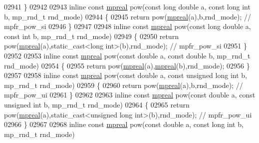 \begin{DoxyCode}
{{02941 \}
02942 
02943 \textcolor{keyword}{inline} \textcolor{keyword}{const} \hyperlink{classmpfr_1_1mpreal}{mpreal} pow(\textcolor{keyword}{const} \textcolor{keywordtype}{long} \textcolor{keywordtype}{double} a, \textcolor{keyword}{const} \textcolor{keywordtype}{long} \textcolor{keywordtype}{int} b, mp\_rnd\_t rnd\_mode)
02944 \{
02945     \textcolor{keywordflow}{return} pow(\hyperlink{classmpfr_1_1mpreal}{mpreal}(a),b,rnd\_mode); \textcolor{comment}{// mpfr\_pow\_si}
02946 \}
02947 
02948 \textcolor{keyword}{inline} \textcolor{keyword}{const} \hyperlink{classmpfr_1_1mpreal}{mpreal} pow(\textcolor{keyword}{const} \textcolor{keywordtype}{long} \textcolor{keywordtype}{double} a, \textcolor{keyword}{const} \textcolor{keywordtype}{int} b, mp\_rnd\_t rnd\_mode)
02949 \{
02950     \textcolor{keywordflow}{return} pow(\hyperlink{classmpfr_1_1mpreal}{mpreal}(a),static\_cast<long int>(b),rnd\_mode); \textcolor{comment}{// mpfr\_pow\_si}
02951 \}
02952 
02953 \textcolor{keyword}{inline} \textcolor{keyword}{const} \hyperlink{classmpfr_1_1mpreal}{mpreal} pow(\textcolor{keyword}{const} \textcolor{keywordtype}{double} a, \textcolor{keyword}{const} \textcolor{keywordtype}{double} b, mp\_rnd\_t rnd\_mode)
02954 \{
02955     \textcolor{keywordflow}{return} pow(\hyperlink{classmpfr_1_1mpreal}{mpreal}(a),\hyperlink{classmpfr_1_1mpreal}{mpreal}(b),rnd\_mode);
02956 \}
02957 
02958 \textcolor{keyword}{inline} \textcolor{keyword}{const} \hyperlink{classmpfr_1_1mpreal}{mpreal} pow(\textcolor{keyword}{const} \textcolor{keywordtype}{double} a, \textcolor{keyword}{const} \textcolor{keywordtype}{unsigned} \textcolor{keywordtype}{long} \textcolor{keywordtype}{int} b, mp\_rnd\_t rnd\_mode)
02959 \{
02960     \textcolor{keywordflow}{return} pow(\hyperlink{classmpfr_1_1mpreal}{mpreal}(a),b,rnd\_mode); \textcolor{comment}{// mpfr\_pow\_ui}
02961 \}
02962 
02963 \textcolor{keyword}{inline} \textcolor{keyword}{const} \hyperlink{classmpfr_1_1mpreal}{mpreal} pow(\textcolor{keyword}{const} \textcolor{keywordtype}{double} a, \textcolor{keyword}{const} \textcolor{keywordtype}{unsigned} \textcolor{keywordtype}{int} b, mp\_rnd\_t rnd\_mode)
02964 \{
02965     \textcolor{keywordflow}{return} pow(\hyperlink{classmpfr_1_1mpreal}{mpreal}(a),static\_cast<unsigned long int>(b),rnd\_mode); \textcolor{comment}{// mpfr\_pow\_ui}
02966 \}
02967 
02968 \textcolor{keyword}{inline} \textcolor{keyword}{const} \hyperlink{classmpfr_1_1mpreal}{mpreal} pow(\textcolor{keyword}{const} \textcolor{keywordtype}{double} a, \textcolor{keyword}{const} \textcolor{keywordtype}{long} \textcolor{keywordtype}{int} b, mp\_rnd\_t rnd\_mode)
}}
\end{DoxyCode}
